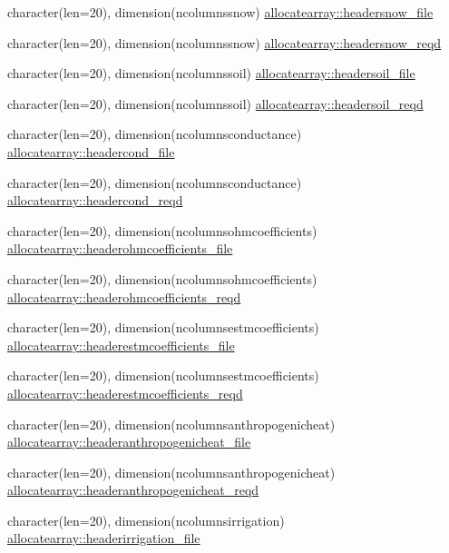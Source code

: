 \begin{DoxyCompactItemize}
\item 
character(len=20), dimension(ncolumnssnow) \hyperlink{namespaceallocatearray_a3aa165ae073295417f62462fa15676da}{allocatearray\+::headersnow\+\_\+file}
\item 
character(len=20), dimension(ncolumnssnow) \hyperlink{namespaceallocatearray_a582758673cb4b699f9845aa05dc3d3b0}{allocatearray\+::headersnow\+\_\+reqd}
\item 
character(len=20), dimension(ncolumnssoil) \hyperlink{namespaceallocatearray_a9031fbce0a0f6d10e36ea7ff3ae3f49b}{allocatearray\+::headersoil\+\_\+file}
\item 
character(len=20), dimension(ncolumnssoil) \hyperlink{namespaceallocatearray_ae457c859ad17442ce09399707fecd342}{allocatearray\+::headersoil\+\_\+reqd}
\item 
character(len=20), dimension(ncolumnsconductance) \hyperlink{namespaceallocatearray_adabcfce2cc166c20164de6589b4402f1}{allocatearray\+::headercond\+\_\+file}
\item 
character(len=20), dimension(ncolumnsconductance) \hyperlink{namespaceallocatearray_ab87870fe28357b94254d1d6c35e06290}{allocatearray\+::headercond\+\_\+reqd}
\item 
character(len=20), dimension(ncolumnsohmcoefficients) \hyperlink{namespaceallocatearray_ab57027814b6b042a4069c3a133738d76}{allocatearray\+::headerohmcoefficients\+\_\+file}
\item 
character(len=20), dimension(ncolumnsohmcoefficients) \hyperlink{namespaceallocatearray_a7a6f653f2a1b5e347b03dd6b859f1ff5}{allocatearray\+::headerohmcoefficients\+\_\+reqd}
\item 
character(len=20), dimension(ncolumnsestmcoefficients) \hyperlink{namespaceallocatearray_ae482241585a630ce1c579f7016feaa72}{allocatearray\+::headerestmcoefficients\+\_\+file}
\item 
character(len=20), dimension(ncolumnsestmcoefficients) \hyperlink{namespaceallocatearray_ae236b7dc5f2a5772c73b7f382f618cb5}{allocatearray\+::headerestmcoefficients\+\_\+reqd}
\item 
character(len=20), dimension(ncolumnsanthropogenicheat) \hyperlink{namespaceallocatearray_a79c2984467ad2372c14bf2b1bab91392}{allocatearray\+::headeranthropogenicheat\+\_\+file}
\item 
character(len=20), dimension(ncolumnsanthropogenicheat) \hyperlink{namespaceallocatearray_aa4b6448bbb7e330b4d44bedbc6ca04fd}{allocatearray\+::headeranthropogenicheat\+\_\+reqd}
\item 
character(len=20), dimension(ncolumnsirrigation) \hyperlink{namespaceallocatearray_abdd6fb7f3cb84c748a69991e7238514b}{allocatearray\+::headerirrigation\+\_\+file}

\end{DoxyCompactItemize}
